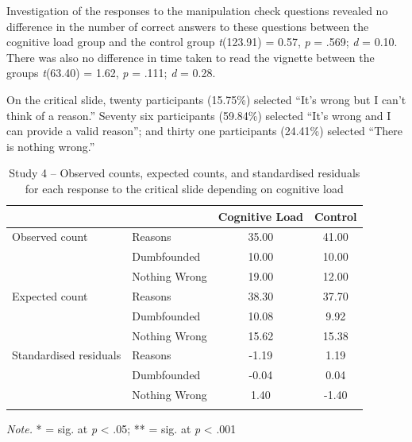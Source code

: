 \documentclass[
  american,
  man,floatsintext]{apa7}
\begin{document}
Investigation of the responses to the manipulation check questions revealed no difference in the number of correct answers to these questions between the cognitive load group and the control group \emph{t}(123.91) = 0.57, \emph{p} = .569; \emph{d} = 0.10. There was also no difference in time taken to read the vignette between the groups \emph{t}(63.40) = 1.62, \emph{p} = .111; \emph{d} = 0.28.

On the critical slide, twenty participants (15.75\%) selected ``It's wrong but I can't think of a reason.'' Seventy six participants (59.84\%) selected ``It's wrong and I can provide a valid reason''; and thirty one participants (24.41\%) selected ``There is nothing wrong.''

\begin{table}[tbp]

\begin{center}
\begin{threeparttable}

\caption{\label{tab:S4tab1dumb}Study 4 – Observed counts, expected counts, and standardised residuals for each response to the critical slide depending on cognitive load}

\begin{tabular}{llcc}
\toprule
 & \multicolumn{1}{c}{} & \multicolumn{1}{c}{Cognitive Load} & \multicolumn{1}{c}{Control}\\
\midrule
Observed count & Reasons & 35.00 & 41.00\\
 & Dumbfounded & 10.00 & 10.00\\
 & Nothing Wrong & 19.00 & 12.00\\
Expected count & Reasons & 38.30 & 37.70\\
 & Dumbfounded & 10.08 & 9.92\\
 & Nothing Wrong & 15.62 & 15.38\\
Standardised residuals & Reasons & -1.19 & 1.19\\
 & Dumbfounded & -0.04 & 0.04\\
 & Nothing Wrong & 1.40 & -1.40\\
\bottomrule
\addlinespace
\end{tabular}

\begin{tablenotes}[para]
\normalsize{\textit{Note.} * = sig. at \emph{p} < .05; ** = sig. at \emph{p} < .001}
\end{tablenotes}

\end{threeparttable}
\end{center}

\end{table}
\end{document}
